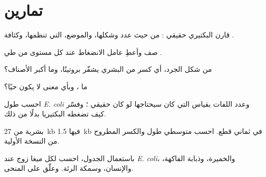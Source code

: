 \section{تمارين}

\begin{exercise}[$\star$]\label{exo:b1:genomes:1}
قارن  البكتيري  حقيقي : من حيث عدد 
وشكلها، والموضع،  التي تنظمها، وكثافة .
\end{exercise}

\begin{exercise}[$\star$]\label{exo:b1:genomes:2}
صف  وأعطِ عامل الانضغاط عند كل مستوى من طي .
\end{exercise}

\begin{exercise}[$\star$]\label{exo:b1:genomes:3}
من شكل الجرد، أي كسر من  البشري يشفّر بروتينًا، وما أكبر
الأصناف؟
\end{exercise}

\begin{exercise}[$\star$]\label{exo:b1:genomes:4}
ما ، وبأي معنى لا يكون حيًا؟
\end{exercise}

\begin{exercise}[$\star\star$]\label{exo:b1:genomes:5}
احسب طول  \emph{E. coli} وعدد اللفات بقياس  التي
كان سيحتاجها لو كان حقيقي ؛ وفسّر كيف تضغطه البكتيريا بدلًا من
ذلك.
\end{exercise}

\begin{exercise}[$\star\star$]\label{exo:b1:genomes:6}
 بشرية من \qty{27}{kb} فيها \qty{1.5}{kb}  في ثماني
قطع. احسب متوسطي طول   والكسر المطروح من النسخة
الأولية.
\end{exercise}

\begin{exercise}[$\star\star$]\label{exo:b1:genomes:7}
باستعمال الجدول، احسب  لكل ميغا زوج عند \emph{E. coli}،
والخميرة، وذبابة الفاكهة، والإنسان، وسمكة الرئة. وعلّق على المنحى.
\end{exercise}

